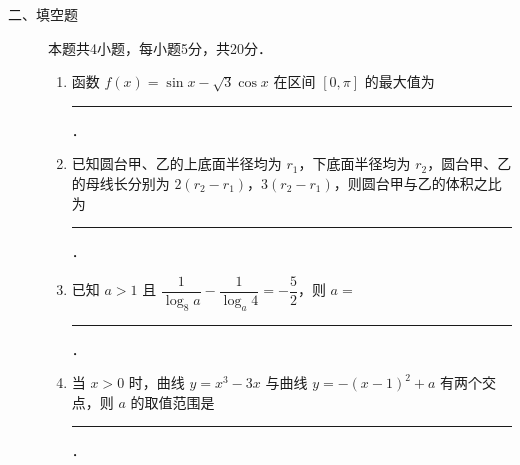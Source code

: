 \begin{description}
    \item[二、填空题] 本题共4小题，每小题5分，共20分．
    \begin{enumerate}[leftmargin=5pt]
      \addtocounter{enumi}{+12}
        \item 函数 $f(x)=\sin x-\sqrt{3}\cos x$ 在区间 $[0,\pi]$ 的最大值为 \rule[-0.3ex]{3em}{0.4pt}．
        \item 已知圆台甲、乙的上底面半径均为 $r_1$，下底面半径均为 $r_2$，圆台甲、乙的母线长分别为 $2(r_2-r_1)$，$3(r_2-r_1)$，则圆台甲与乙的体积之比为 \rule[-0.3ex]{3em}{0.4pt}．
        \item 已知 $a>1$ 且 $\dfrac{1}{\log_8 a}-\dfrac{1}{\log_a 4}=-\dfrac{5}{2}$，则 $a=$ \rule[-0.3ex]{3em}{0.4pt}．
        \item 当 $x>0$ 时，曲线 $y=x^3-3x$ 与曲线 $y=-(x-1)^2+a$ 有两个交点，则 $a$ 的取值范围是 \rule[-0.3ex]{3em}{0.4pt}．
    \end{enumerate}
\end{description}

